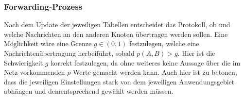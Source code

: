 \documentclass[a4paper, 12pt]{article}
\begin{document}
\subsubsection{Forwarding-Prozess}
\label{sec:prophet:forwarding}
Nach dem Update der jeweiligen Tabellen entscheidet das Protokoll, ob und welche Nachrichten an den anderen Knoten übertragen werden sollen. Eine Möglichkeit wäre eine Grenze $g \in (0,1)$ festzulegen, welche eine Nachrichtenübertragung herbeiführt, sobald $p(A,B) > g$. Hier ist die Schwierigkeit $g$ korrekt festzulegen, da ohne weiteres keine Aussage über die im Netz vorkommenden $p$-Werte gemacht werden kann.
Auch hier ist zu betonen, dass die jeweiligen Einstellungen stark von dem jeweiligen Anwendungsgebiet abhängen und dementsprechend gewählt werden müssen.
\end{document}
